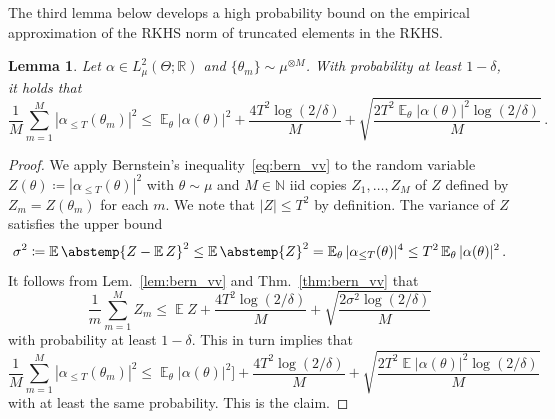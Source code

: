 \documentclass{article}
\theoremstyle{plain}
\newtheorem{lemma}[theorem]{Lemma}
\theoremstyle{my_def}
\theoremstyle{my_rem}
\numberwithin{equation}{section}
\numberwithin{theorem}{section}%
\newcommand{\R}{\mathbb{R}}
\newcommand{\E}{\mathbb{E}}
\newcommand{\N}{\mathbb{N}}
\newcommand{\abs}{\abstemp}
\newcommand{\defeq}{\coloneqq} %
\renewcommand{\E}{\operatorname{\mathbb{E}}} %
\newcommand{\al}{\alpha}
\newcommand{\Th}{{\{\theta_m\}}}
\begin{document}
The third lemma below develops a high probability bound on the empirical approximation of the RKHS norm of truncated elements in the RKHS.
\begin{lemma}
\label{lem:3}
Let $\al\in L^2_\mu(\Theta;\R)$ and $\Th\sim\mu^{\otimes M}$. With probability at least $1-\delta$, it holds that
\begin{equation}
    \frac{1}{M} \sum_{m=1}^M |\al_{\le T}(\theta_m)|^2 
    \le 
    \E_\theta|\al(\theta)|^2 + \frac{4T^2 \log(2/\delta)}{M} + \sqrt{\frac{2T^2 \E_\theta|\al(\theta)|^2 \log(2/\delta)}{M}}\,.
\end{equation}
\end{lemma}

\begin{proof}
We apply Bernstein's inequality~\eqref{eq:bern_vv} to the random variable $Z(\theta) \defeq |\alpha_{\le T}(\theta)|^2$ with $\theta\sim \mu$ and $M\in\N$ iid copies $Z_1,\dots, Z_M$ of $Z$ defined by $Z_m = Z(\theta_m)$ for each $m$. We note that $|Z|\le T^2$ by definition. The variance of $Z$ satisfies the upper bound
\begin{equation*}
    \sigma^2\defeq \E\abs{Z-\E Z}^2
\le \E\abs{Z}^2 
=\E_\theta|\al_{\le T}(\theta)|^4
\le T^2 \E_\theta|\al(\theta)|^2\,.
\end{equation*}
It follows from Lem.~\ref{lem:bern_vv} and Thm.~\ref{thm:bern_vv} that
\begin{equation*}
    \frac{1}{m} \sum_{m=1}^M Z_m 
\le 
\E Z + \frac{4T^2 \log(2/\delta)}{M} + \sqrt{\frac{2\sigma^2 \log(2/\delta)}{M}}
\end{equation*}
with probability at least $1-\delta$. This in turn implies that
\begin{equation*}
    \frac{1}{M} \sum_{m=1}^M |\alpha_{\le T}(\theta_m)|^2 
\le 
\E_\theta|\al(\theta)|^2] + \frac{4T^2 \log(2/\delta)}{M} + \sqrt{\frac{2T^2 \E|\al(\theta)|^2 \log(2/\delta)}{M}}
\end{equation*}
with at least the same probability. This is the claim.
\end{proof}
\end{document}
